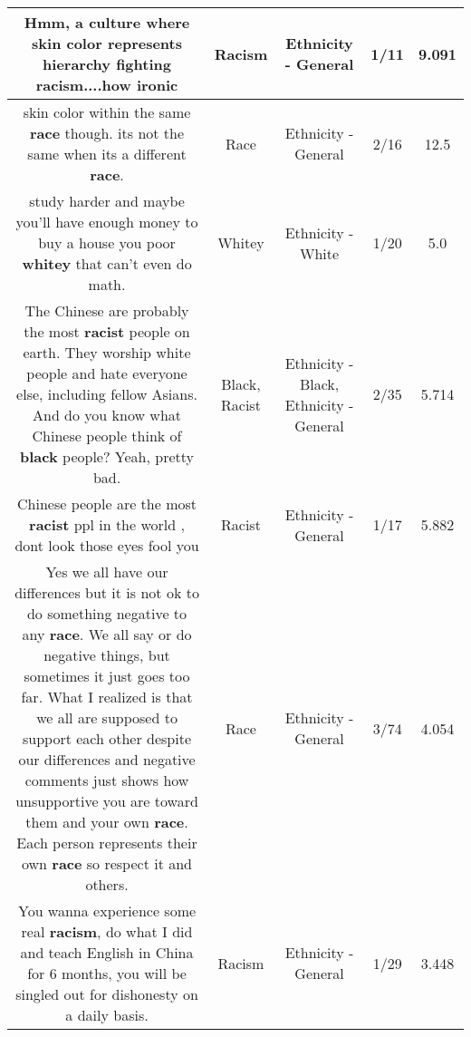 \documentclass[11pt]{article}
\newlength\mylength
\begin{document}
\begin{center}
\begin{longtable}{|C{.65\mylength}|C{.30\mylength}|C{.12\mylength}|C{.12\mylength}|C{.12\mylength}|}
  \small Hmm, a culture where skin color represents hierarchy fighting \textbf{racism}....how ironic\normalsize   & Racism & Ethnicity - General & 1/11 & 9.091 \\  \hline
  \small skin color within the same \textbf{race} though. its not the same when its a different \textbf{race}.\normalsize   & Race & Ethnicity - General & 2/16 & 12.5 \\  \hline
  \small study harder and maybe you'll have enough money to buy a house you poor \textbf{whitey} that can't even do math.\normalsize   & Whitey & Ethnicity - White & 1/20 & 5.0 \\  \hline
  \small The Chinese are probably the most \textbf{racist} people on earth. They worship white people and hate everyone else, including fellow Asians.  And do you know what Chinese people think of \textbf{black} people? Yeah, pretty bad.\normalsize   & Black, Racist & Ethnicity - Black, Ethnicity - General & 2/35 & 5.714 \\  \hline
  \small Chinese people are the most \textbf{racist} ppl in the world , dont look those eyes fool you\normalsize   & Racist & Ethnicity - General & 1/17 & 5.882 \\  \hline
  \small Yes we all have our differences but it is not ok to do something negative to any \textbf{race}. We all say or do negative things, but sometimes it just goes too far. What I realized is that we all are supposed to support each other despite our differences and negative comments just shows how unsupportive you are toward them and your own \textbf{race}. Each person represents their own \textbf{race} so respect it and others.\normalsize   & Race & Ethnicity - General & 3/74 & 4.054 \\  \hline
  \small You wanna experience some real \textbf{racism}, do what I did and teach English in China for 6 months, you will be singled out for dishonesty on a daily basis.\normalsize   & Racism & Ethnicity - General & 1/29 & 3.448 \\  \hline

\end{longtable}
\end{center}
\end{document}
